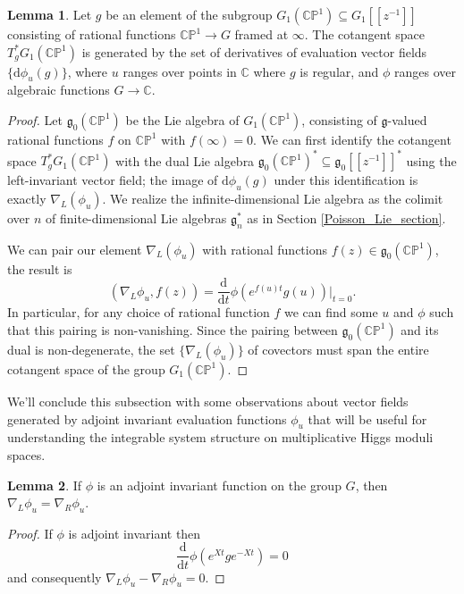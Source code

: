 \documentclass[11pt, oneside, reqno]{amsart}
\theoremstyle{definition} \newtheorem{definition}{Definition}[section]
\newtheorem{lemma}[definition]{Lemma}
\theoremstyle{definition} \newtheorem{remark}[definition]{Remark}
\theoremstyle{definition} \newtheorem{remarks}[definition]{Remarks}
\theoremstyle{definition} \newtheorem{question}[definition]{Question}
\theoremstyle{definition} \newtheorem*{note}{Note}
\theoremstyle{definition} \newtheorem{example}[definition]{Example}
\theoremstyle{definition} \newtheorem{examples}[definition]{Examples}
\renewcommand{\gg}{\mathfrak{g}}
\newcommand{\bb}[1]{\mathbb{#1}}
\newcommand{\CC}{\mathbb{C}}
\newcommand{\sub}{\subseteq}
\renewcommand{\d}{\mathrm{d}}
\begin{document}
\begin{lemma} \label{evaluation_vector_fields_generate_lemma}
Let $g$ be an element of the subgroup $G_1(\bb{CP}^1) \sub G_1[[z^{-1}]]$ consisting of rational functions $\bb{CP}^1 \to G$ framed at $\infty$.  The cotangent space $T^*_g G_1(\bb{CP}^1)$ is generated by the set of derivatives of evaluation vector fields $\{\d \phi_u(g)\}$, where $u$ ranges over points in $\CC$ where $g$ is regular, and $\phi$ ranges over algebraic functions $G \to \CC$.
\end{lemma}

\begin{proof}
Let $\gg_0(\bb{CP}^1)$ be the Lie algebra of $G_1(\bb{CP}^1)$, consisting of $\gg$-valued rational functions $f$ on $\bb{CP}^1$ with $f(\infty) = 0$. We can first identify the cotangent space $T^*_g G_1(\bb{CP}^1)$ with the dual Lie algebra $\gg_0(\bb{CP}^1)^* \sub \gg_0[[z^{-1}]]^*$ using the left-invariant vector field; the image of $\d \phi_u(g)$ under this identification is exactly $\nabla_L(\phi_u)$.  We realize the infinite-dimensional Lie algebra as the colimit over $n$ of finite-dimensional Lie algebras $\gg_n^*$ as in Section \ref{Poisson_Lie_section}. 

We can pair our element $\nabla_L(\phi_u)$ with rational functions $f(z) \in \gg_0(\bb{CP}^1)$, the result is
\[(\nabla_{L} \phi_u, f(z)) = \frac{\d}{\d t} \phi(e^{f(u) t} g(u))|_{t=0}.\]
In particular, for any choice of rational function $f$ we can find some $u$ and $\phi$ such that this pairing is non-vanishing.  Since the pairing between $\gg_0(\bb{CP}^1)$ and its dual is non-degenerate, the set $\{\nabla_L(\phi_u)\}$ of covectors must span the entire cotangent space of the group $G_1(\bb{CP}^1)$.
\end{proof}

We'll conclude this subsection with some observations about vector fields generated by adjoint invariant evaluation functions $\phi_u$ that will be useful for understanding the integrable system structure on multiplicative Higgs moduli spaces. 
\begin{lemma}
 If $\phi$ is an adjoint invariant function on the group $G$, then
$\nabla_{L} \phi_u  = \nabla_{R} \phi_u$. 
\end{lemma}

\begin{proof}
  If $\phi$ is adjoint invariant then
  \[
    \frac{\d}{\d t} \phi(e^{Xt} g e^{-Xt}) = 0
  \]
  and consequently $\nabla_{L} \phi_u - \nabla_{R} \phi_u  = 0$. 
\end{proof}
\end{document}
